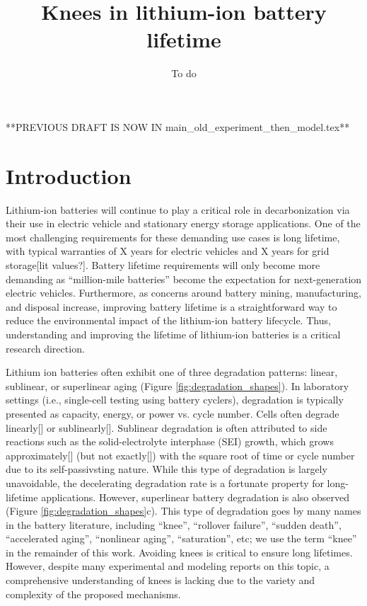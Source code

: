 \documentclass{article}
\title{Knees in lithium-ion battery lifetime}
\author{To do}
\date{}
\begin{document}
\maketitle

**PREVIOUS DRAFT IS NOW IN main\_old\_experiment\_then\_model.tex**

\section{Introduction}

Lithium-ion batteries will continue to play a critical role in decarbonization via their use in electric vehicle and stationary energy storage applications. One of the most challenging requirements for these demanding use cases is long lifetime, with typical warranties of X years for electric vehicles and X years for grid storage[lit values?]. Battery lifetime requirements will only become more demanding as “million-mile batteries” become the expectation for next-generation electric vehicles. Furthermore, as concerns around battery mining, manufacturing, and disposal increase, improving battery lifetime is a straightforward way to reduce the environmental impact of the lithium-ion battery lifecycle. Thus, understanding and improving the lifetime of lithium-ion batteries is a critical research direction.

Lithium ion batteries often exhibit one of three degradation patterns: linear, sublinear, or superlinear aging (Figure \ref{fig:degradation_shapes}). In laboratory settings (i.e., single-cell testing using battery cyclers), degradation is typically presented as capacity, energy, or power vs. cycle number. Cells often degrade linearly[] or sublinearly[]. Sublinear degradation is often attributed to side reactions such as the solid-electrolyte interphase (SEI) growth, which grows approximately[] (but not exactly[]) with the square root of time or cycle number due to its self-passivsting nature. While this type of degradation is largely unavoidable, the decelerating degradation rate is a fortunate property for long-lifetime applications. However, superlinear battery degradation is also observed (Figure \ref{fig:degradation_shapes}c). This type of degradation goes by many names in the battery literature, including ``knee'', ``rollover failure'', ``sudden death'', ``accelerated aging'', ``nonlinear aging'', ``saturation'', etc; we use the term ``knee'' in the remainder of this work. Avoiding knees is critical to ensure long lifetimes. However, despite many experimental and modeling reports on this topic, a comprehensive understanding of knees is lacking due to the variety and complexity of the proposed mechanisms.
\end{document}
